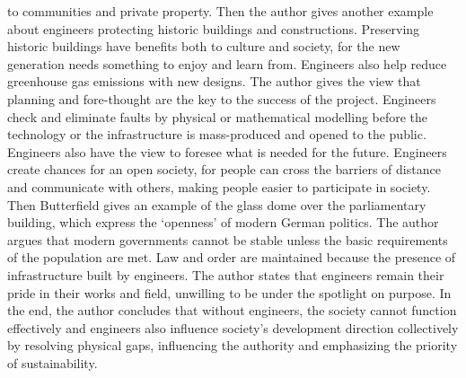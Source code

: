 \documentclass[12pt,a4]{article}
\begin{document}
to communities and private property.
Then the author gives another example about engineers protecting historic
buildings and constructions.
Preserving historic buildings have benefits both to culture and society, for the
new generation needs something to enjoy and learn from.
Engineers also help reduce greenhouse gas emissions with new designs.
%
%
The author gives the view that planning and fore-thought are the key to the
success of the project.
Engineers check and eliminate faults by physical or mathematical modelling
before the technology or the infrastructure is mass-produced and opened to the
public.
Engineers also have the view to foresee what is needed for the future.
%
%
Engineers create chances for an open society, for people can cross the
barriers of distance and communicate with others, making people easier to
participate in society.
Then Butterfield gives an example of the glass dome over the parliamentary
building, which express the `openness' of modern German politics.
The author argues that modern governments cannot be stable unless the basic
requirements of the population are met.
Law and order are maintained because the presence of infrastructure built by
engineers.
%
The author states that engineers remain their pride in their works and field,
unwilling to be under the spotlight on purpose.
%
In the end, the author concludes that without engineers, the society cannot
function effectively and engineers also influence society's development
direction collectively by resolving physical gaps, influencing the authority and
emphasizing the priority of sustainability.  
%
%

\newpage


\end{document}
